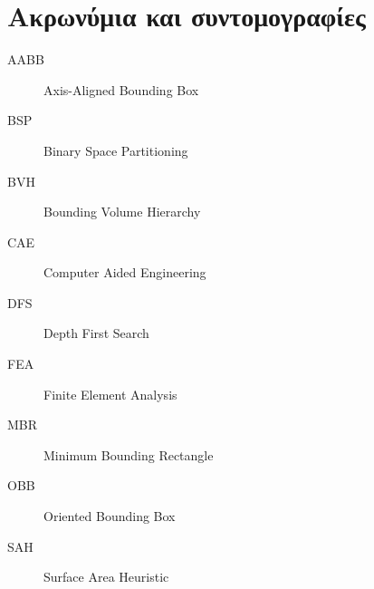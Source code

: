 \chapter{Ακρωνύμια και συντομογραφίες}

\begin{description}
  \item[AABB] Axis-Aligned Bounding Box
  \item[BSP] Binary Space Partitioning
  \item[BVH] Bounding Volume Hierarchy
  \item[CAE] Computer Aided Engineering
  \item[DFS] Depth First Search
  \item[FEA] Finite Element Analysis
  \item[MBR] Minimum Bounding Rectangle
  \item[OBB] Oriented Bounding Box
  \item[SAH] Surface Area Heuristic
\end{description}
